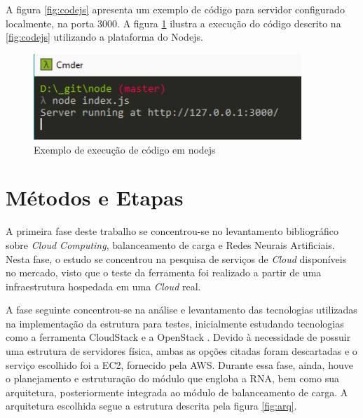 A figura \ref{fig:codejs} apresenta um exemplo de código para servidor configurado localmente, na porta 3000. A figura \ref{fig:consolejs} ilustra a execução do código descrito na \ref{fig:codejs} utilizando a plataforma do Nodejs. 

\begin{figure}[htb]
	\caption{\label{fig:consolejs}Exemplo de execução de código em nodejs}
	\begin{center}
		\includegraphics[width=0.90\textwidth]{img/consolejs.png}
	\end{center}
\end{figure}
\section{Métodos e Etapas}\label{sec:metodos-etapas}

A primeira fase deste trabalho se concentrou-se no levantamento bibliográfico sobre \textit{Cloud Computing}, balanceamento de carga e Redes Neurais Artificiais. Nesta fase, o estudo se concentrou na pesquisa de serviços de \textit{Cloud} disponíveis no mercado, visto que o teste da ferramenta foi realizado a partir de uma infraestrutura hospedada em uma \textit{Cloud} real. 

A fase seguinte concentrou-se na análise e levantamento das tecnologias utilizadas na implementação da estrutura para testes, inicialmente estudando tecnologias como a ferramenta CloudStack \cite{cloudstack} e a OpenStack \cite{openstack}. Devido à necessidade de possuir uma estrutura de servidores física, ambas as opções citadas foram descartadas e o serviço escolhido foi a EC2\cite{AmazonEC2}, fornecido pela AWS. Durante essa fase, ainda, houve o planejamento e estruturação do módulo que engloba a RNA, bem como sua arquitetura, posteriormente integrada ao módulo de balanceamento de carga. A arquitetura escolhida segue a estrutura descrita pela figura \ref{fig:arq}. 

